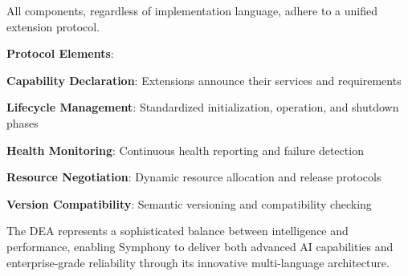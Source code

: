 All components, regardless of implementation language, adhere to a unified extension protocol.

\textbf{Protocol Elements}:
\begin{compactlist}
    \item \textbf{Capability Declaration}: Extensions announce their services and requirements
    \item \textbf{Lifecycle Management}: Standardized initialization, operation, and shutdown phases
    \item \textbf{Health Monitoring}: Continuous health reporting and failure detection
    \item \textbf{Resource Negotiation}: Dynamic resource allocation and release protocols
    \item \textbf{Version Compatibility}: Semantic versioning and compatibility checking
\end{compactlist}

The DEA represents a sophisticated balance between intelligence and performance, enabling Symphony to deliver both advanced AI capabilities and enterprise-grade reliability through its innovative multi-language architecture.